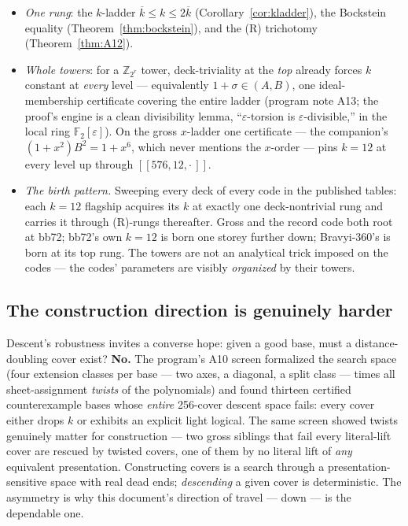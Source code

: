 \documentclass[11pt]{article}
\theoremstyle{plain}
\theoremstyle{definition}
\theoremstyle{remark}
\newcommand{\F}{\mathbb{F}}
\newcommand{\Z}{\mathbb{Z}}
\newcommand{\ov}[1]{\overline{#1}}
\begin{document}
\begin{itemize}[leftmargin=2em]
\item \emph{One rung}: the $k$-ladder $\ov k \leq k \leq 2\ov k$
  (Corollary~\ref{cor:kladder}), the Bockstein equality
  (Theorem~\ref{thm:bockstein}), and the (R) trichotomy
  (Theorem~\ref{thm:A12}).
\item \emph{Whole towers}: for a $\Z_{2^r}$ tower, deck-triviality at
  the \emph{top} already forces $k$ constant at \emph{every} level ---
  equivalently $1 + \sigma \in (A,B)$, one ideal-membership certificate
  covering the entire ladder (program note A13; the proof's engine is a
  clean divisibility lemma, ``$\varepsilon$-torsion is
  $\varepsilon$-divisible,'' in the local ring $\F_2[\varepsilon]$).
  On the gross $x$-ladder one certificate --- the companion's
  $(1+x^2)B^2 = 1+x^6$, which never mentions the $x$-order --- pins
  $k = 12$ at every level up through $[[576,12,\cdot\,]]$.
\item \emph{The birth pattern.} Sweeping every deck of every code in the
  published tables: each $k = 12$ flagship acquires its $k$ at exactly
  one deck-nontrivial rung and carries it through (R)-rungs thereafter.
  Gross and the record code both root at bb72; bb72's own $k = 12$ is
  born one storey further down; Bravyi-360's is born at its top rung.
  The towers are not an analytical trick imposed on the codes --- the
  codes' parameters are visibly \emph{organized} by their towers.
\end{itemize}

\subsection{The construction direction is genuinely harder}

Descent's robustness invites a converse hope: given a good base, must a
distance-doubling cover exist? \textbf{No.} The program's A10 screen
formalized the search space (four extension classes per base --- two
axes, a diagonal, a split class --- times all sheet-assignment
\emph{twists} of the polynomials) and found thirteen certified
counterexample bases whose \emph{entire} 256-cover descent space fails:
every cover either drops $k$ or exhibits an explicit light logical. The
same screen showed twists genuinely matter for construction --- two
gross siblings that fail every literal-lift cover are rescued by twisted
covers, one of them by no literal lift of \emph{any} equivalent
presentation. Constructing covers is a search through a
presentation-sensitive space with real dead ends; \emph{descending} a
given cover is deterministic. The asymmetry is why this document's
direction of travel --- down --- is the dependable one.
\end{document}
